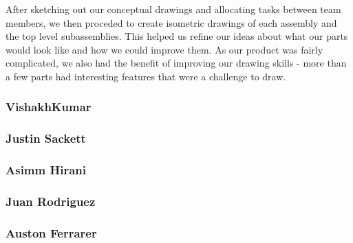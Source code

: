 After sketching out our conceptual drawings and allocating tasks between team members, we then proceded to create isometric drawings of each assembly and the top level subassemblies.
This helped us refine our ideas about what our parts would look like and how we could improve them.
As our product was fairly complicated, we also had the benefit of improving our drawing skills - more than a few parts had interesting features that were a challenge to draw.

\subsubsection{VishakhKumar}

\subsubsection{Justin Sackett}

\subsubsection{Asimm Hirani}

\subsubsection{Juan Rodriguez}

\subsubsection{Auston Ferrarer}

